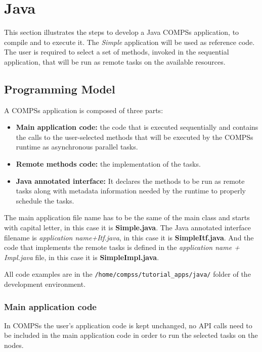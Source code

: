 \section{Java}
\label{sec:Java}

This section illustrates the steps to develop a Java COMPSs application, to compile and to execute it. The \textit{Simple} application will be used as reference code. 
The user is required to select a set of methods, invoked in the sequential application, that will be run as remote tasks on the available resources.

\subsection{Programming Model}
A COMPSs application is composed of three parts:
\begin{itemize}
 \item \textbf{Main application code:} the code that is executed sequentially and contains the calls to the user-selected methods 
 that will be executed by the COMPSs runtime as asynchronous parallel tasks.
 \item \textbf{Remote methods code:} the implementation of the tasks.
 \item \textbf{Java annotated interface:} It declares the methods to be run as remote tasks along with metadata information needed by the runtime to properly schedule the tasks.
\end{itemize}

The main application file name has to be the same of the main class and starts with capital
letter, in this case it is \textbf{Simple.java}. The Java annotated interface filename is \textit{application name+Itf.java}, in this case it is \textbf{SimpleItf.java}. And the code that implements the remote tasks is defined in the \textit{application name + Impl.java} file, in this case it is \textbf{SimpleImpl.java}.

All code examples are in the \verb|/home/compss/tutorial_apps/java/| folder of the development environment.


\subsubsection{Main application code}

In COMPSs the user's application code is kept unchanged, no API calls need to be included in the main
application code in order to run the selected tasks on the nodes.

